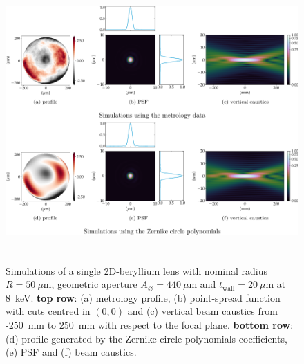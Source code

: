 \begin{refsection}
\begin{figure}[t]
        \centering
        {\includegraphics[height=10cm]{figures/ch04/metrology_zernike_simualtions.pdf}}
        \caption[Effects of other sources of deviations from the parabolic shape - single lens]{Simulations of a single 2D-beryllium lens with nominal radius $R=50~\mu\text{m}$, geometric aperture $A_{\diameter}=440~\mu\text{m}$ and $t_\text{wall}=20~\mu$m at 8~keV. \textbf{top row}: (a) metrology profile, (b) point-spread function with cuts centred in $(0,0)$ and (c) vertical beam caustics from -250~mm to 250~mm with respect to the focal plane. \textbf{bottom row}: (d) profile generated by the Zernike circle polynomials coefficients, (e) PSF and (f) beam caustics.} \label{fig:metrology_zernike_simualtions}
\end{figure}


\end{refsection}

